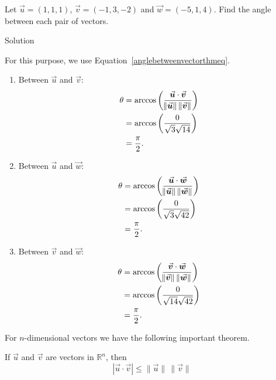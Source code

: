 \begin{example}
Let $\vec u = \left( 1,1,1\right)$, $\vec v = \left( -1,3,-2\right)$ and $\vec w = \left( -5,1,4\right)$. Find the angle between each pair of vectors.


Solution 


For this purpose, we use Equation~\eqref{anglebetweenvectorthmeq}. 
\begin{enumerate}
	\item Between $\vec u$ and $\vec v$:
	\begin{align*}
	\theta &= \arccos\left(\frac{\dotp uv}{\norm{\vec u} \, \norm{\vec v}}\right)\\
					&= \arccos\left(\frac{0}{\sqrt{3}\sqrt{14}}\right)\\
					&= \frac{\pi}2.
	\end{align*}
	\item	Between $\vec u$ and $\vec w$:
	\begin{align*}
	\theta &= \arccos\left(\frac{\dotp uw}{\norm{\vec u} \, \norm{\vec w}}\right)\\
					&= \arccos\left(\frac{0}{\sqrt{3}\sqrt{42}}\right)\\
					&= \frac{\pi}2.
	\end{align*}
	\item	Between $\vec v$ and $\vec w$:
	\begin{align*}
	\theta &= \arccos\left(\frac{\dotp vw}{\norm{\vec v} \, \norm{\vec w}}\right)\\
					&= \arccos\left(\frac{0}{\sqrt{14}\sqrt{42}}\right)\\
					&= \frac{\pi}2.
	\end{align*}
\end{enumerate}
\end{example}

\ifanalysis

For $n$-dimensional vectors we have the following important theorem. 
\begin{theorem}\label{theo:cuachy}
If $\vec{u}$ and $\vec{v}$ are vectors in $\mathbb{R}^n$, then
$$|\vec{u}\cdot\vec{v}|\le\|\vec{u}\| \, \|\vec{v}\|$$
\end{theorem}

